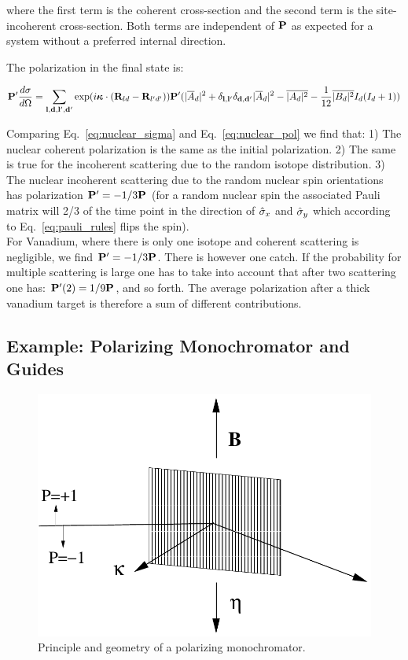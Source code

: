 where the first term is the coherent cross-section and the second term is the
site-incoherent cross-section. Both terms are independent of $\mathbf{P}$ as expected
for a system without a preferred internal direction.

The polarization in the final state is:

\begin{equation}
  \label{eq:nuclear_pol}
  \mathbf{P}' \frac{d\sigma}{d\Omega}  = 
  \sum_{\mathbf{l}, \mathbf{d}, \mathbf{l}', \mathbf{d}'} \exp(i \mathbf{\mbox{\boldmath $\kappa$}} \cdot (\mathbf{R}_{ld}-\mathbf{R}_{l'd'}))
  \mathbf{P}' (|\overline{A}_d|^2 + \delta_{\mathbf{l},\mathbf{l}'}\delta_{\mathbf{d},\mathbf{d}'}|\overline{A}_d|^2 - \overline{|A_d|^2} 
  - \frac{1}{12}\overline{|B_d|^2}I_d(I_d+1))
\end{equation}

Comparing Eq.~\ref{eq:nuclear_sigma} and Eq.~\ref{eq:nuclear_pol} we
find that: 1) The nuclear coherent polarization is the same as the
initial polarization. 2) The same is true for the incoherent
scattering due to the random isotope distribution. 3) The nuclear
incoherent scattering due to the random nuclear spin orientations has
polarization $\mathbf{P}' = -1/3 \mathbf{P}$ (for a random nuclear spin the
associated Pauli matrix will 2/3 of the time point in the direction of
$\hat{\sigma}_x$ and $\hat{\sigma}_y$ which according to
Eq.~\ref{eq:pauli_rules} flips the spin). \\

For Vanadium, where there is only one isotope and coherent scattering
is negligible, we find $\mathbf{P}' = -1/3\mathbf{P}$. There is however one
catch. If the probability for multiple scattering is large one has to
take into account that after two scattering one has: $\mathbf{P}'(2) =
1/9\mathbf{P}$, and so forth. The average polarization after a thick vanadium
target is therefore a sum of different contributions.

\subsection{Example: Polarizing Monochromator and Guides}
\label{sub:mono}

\begin{figure}[htbp]
  \begin{center}
    \includegraphics[keepaspectratio,
    width=0.7\columnwidth]{figures/monochromator_pol}
    \caption{Principle and geometry of a polarizing monochromator.}
    \label{fig:mono_princip}
  \end{center}
\end{figure}

